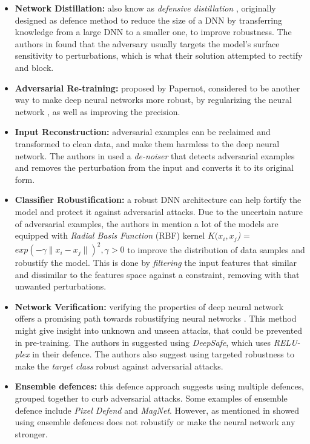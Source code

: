 \documentclass[grad,lot,lof,11pt,oneside,onehalfspace]{RUthesis}
\begin{document}
\begin{itemize}
\item \textbf{Network Distillation:} also know as \textit{defensive distillation} \cite{papernot_distillation_2016}\cite{yuan_adversarial_2017}, originally designed as defence method to reduce the size of a DNN by transferring knowledge from a large DNN to a smaller one, to improve robustness. The authors in \cite{papernot_distillation_2016} found that the adversary usually targets the model's surface sensitivity to perturbations, which is what their solution attempted to rectify and block. 
\item \textbf{Adversarial Re-training:} proposed by Papernot, considered to be another way to make deep neural networks more robust, by regularizing the neural network \cite{goodfellow_explaining_2015}, as well as improving the precision.
\item \textbf{Input Reconstruction:} adversarial examples can be reclaimed and transformed to clean data, and make them harmless to the deep neural network. The authors in \cite{yuan_adversarial_2017} used a \textit{de-noiser} that detects adversarial examples and removes the perturbation from the input and converts it to its original form. 
\item \textbf{Classifier Robustification:} a robust DNN architecture can help fortify the model and protect it against adversarial attacks. Due to the uncertain nature of adversarial examples, the authors in \cite{yuan_adversarial_2017} mention a lot of the models are equipped with \textit{Radial Basis Function} (RBF) kernel \textit{$K(x_{i},x_{j}$)} = \textit{$exp(-\gamma\lVert x_{i} - x_{j}\lVert)^{2},\gamma > 0$} to improve the distribution of data samples and robustify the model. This is done by \textit{filtering} the input features that similar and dissimilar to the features space against a constraint, removing with that unwanted perturbations. 
\item \textbf{Network Verification:} verifying the properties of deep neural network offers a promising path towards robustifying neural networks \cite{yuan_adversarial_2017}. This method might give insight into unknown and unseen attacks, that could be prevented in pre-training. The authors in \cite{yuan_adversarial_2017} suggested using \textit{DeepSafe}, which uses \textit{RELU-plex} in their defence. The authors also suggest using targeted robustness to make the \textit{target class} robust against adversarial attacks.  
\item \textbf{Ensemble defences:} this defence approach suggests using multiple defences, grouped together to curb adversarial attacks. Some examples of ensemble defence include \textit{Pixel Defend} and \textit{MagNet}. However, as mentioned in \cite{yuan_adversarial_2017} showed using ensemble defences does not robustify or make the neural network any stronger. 
\end{itemize}
\newpage
\end{document}
